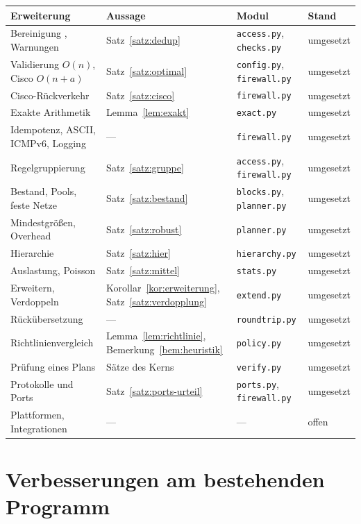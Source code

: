 \documentclass[a4paper,12pt, twoside]{report}
\theoremstyle{definition}
\newcommand{\code}[1]{\texttt{\detokenize{#1}}}
\begin{document}
\begin{center}
\small
\begin{tabular}{p{4.3cm}p{3.5cm}p{3.9cm}l}
\toprule
Erweiterung & Aussage & Modul & Stand \\
\midrule
Bereinigung \code{access}, Warnungen & Satz~\ref{satz:dedup} & \texttt{access.py}, \texttt{checks.py} & umgesetzt \\
Validierung $O(n)$, Cisco $O(n+a)$ & Satz~\ref{satz:optimal} & \texttt{config.py}, \texttt{firewall.py} & umgesetzt \\
Cisco-Rückverkehr & Satz~\ref{satz:cisco} & \texttt{firewall.py} & umgesetzt \\
Exakte Arithmetik & Lemma~\ref{lem:exakt} & \texttt{exact.py} & umgesetzt \\
Idempotenz, ASCII, ICMPv6, Logging & --- & \texttt{firewall.py} & umgesetzt \\
Regelgruppierung & Satz~\ref{satz:gruppe} & \texttt{access.py}, \texttt{firewall.py} & umgesetzt \\
Bestand, Pools, feste Netze & Satz~\ref{satz:bestand} & \texttt{blocks.py}, \texttt{planner.py} & umgesetzt \\
Mindestgrößen, Overhead & Satz~\ref{satz:robust} & \texttt{planner.py} & umgesetzt \\
Hierarchie & Satz~\ref{satz:hier} & \texttt{hierarchy.py} & umgesetzt \\
Auslastung, Poisson & Satz~\ref{satz:mittel} & \texttt{stats.py} & umgesetzt \\
Erweitern, Verdoppeln & Korollar~\ref{kor:erweiterung}, Satz~\ref{satz:verdopplung} & \texttt{extend.py} & umgesetzt \\
Rückübersetzung & --- & \texttt{roundtrip.py} & umgesetzt \\
Richtlinienvergleich & Lemma~\ref{lem:richtlinie}, Bemerkung~\ref{bem:heuristik} & \texttt{policy.py} & umgesetzt \\
Prüfung eines Plans & Sätze des Kerns & \texttt{verify.py} & umgesetzt \\
Protokolle und Ports & Satz~\ref{satz:ports-urteil} & \texttt{ports.py}, \texttt{firewall.py} & umgesetzt \\
Plattformen, Integrationen & --- & --- & offen \\
\bottomrule
\end{tabular}
\label{tab:status}
\end{center}

\section{Verbesserungen am bestehenden Programm}
\end{document}
